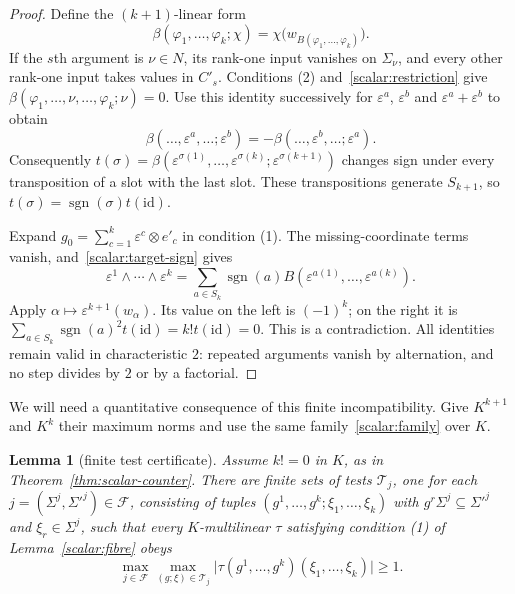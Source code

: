 \documentclass[11pt]{amsart}
\newtheorem{lemma}[theorem]{Lemma}
\theoremstyle{definition}
\theoremstyle{remark}
\numberwithin{equation}{section}
\newcommand{\sgn}{\operatorname{sgn}}
\newcommand{\id}{\mathrm{id}}
\newcommand{\abs}[1]{\lvert #1\rvert}
\begin{document}
\begin{proof}
Define the $(k+1)$\nobreakdash-linear form
\[
 \beta(\varphi_1,\dots,\varphi_k;\chi)
   =\chi\bigl(w_{B(\varphi_1,\dots,\varphi_k)}\bigr).
\]
If the $s$th argument is $\nu\in N$, its rank-one input vanishes on $\Sigma_\nu$, and every other
rank-one input takes values in $C'_s$. Conditions (2) and~\eqref{scalar:restriction} give
$\beta(\varphi_1,\dots,\nu,\dots,\varphi_k;\nu)=0$. Use this identity successively for
$\varepsilon^a$, $\varepsilon^b$ and $\varepsilon^a+\varepsilon^b$ to obtain
\[
 \beta(\dots,\varepsilon^a,\dots;\varepsilon^b)
 =-\beta(\dots,\varepsilon^b,\dots;\varepsilon^a).
\]
Consequently
$t(\sigma)=\beta(\varepsilon^{\sigma(1)},\dots,\varepsilon^{\sigma(k)};
\varepsilon^{\sigma(k+1)})$ changes sign under every transposition of a slot with the last slot.
These transpositions generate $S_{k+1}$, so $t(\sigma)=\sgn(\sigma)t(\id)$.

Expand $g_0=\sum_{c=1}^k\varepsilon^c\otimes e'_c$ in condition (1). The missing-coordinate terms vanish,
and~\eqref{scalar:target-sign} gives
\[
 \varepsilon^1\wedge\cdots\wedge\varepsilon^k
 =\sum_{a\in S_k}\sgn(a)B(\varepsilon^{a(1)},\dots,\varepsilon^{a(k)}).
\]
Apply $\alpha\mapsto\varepsilon^{k+1}(w_\alpha)$. Its value on the left is $(-1)^k$; on the right it is
$\sum_{a\in S_k}\sgn(a)^2t(\id)=k!t(\id)=0$. This is a contradiction. All identities remain valid in
characteristic $2$: repeated arguments vanish by alternation, and no step divides by $2$ or by a factorial.
\end{proof}

We will need a quantitative consequence of this finite incompatibility. Give $K^{k+1}$ and $K^k$ their
maximum norms and use the same family~\eqref{scalar:family} over $K$.

\begin{lemma}[finite test certificate]\label{scalar:certificate}
Assume $k!=0$ in $K$, as in Theorem~\ref{thm:scalar-counter}. There are finite sets of tests $\mathcal T_j$, one for each $j=(\Sigma^j,\Sigma'^j)\in\mathcal F$, consisting of
tuples $(g^1,\dots,g^k;\xi_1,\dots,\xi_k)$ with $g^r\Sigma^j\subseteq\Sigma'^j$ and $\xi_r\in\Sigma^j$,
such that every $K$\nobreakdash-multilinear $\tau$ satisfying condition (1) of Lemma~\ref{scalar:fibre} obeys
\begin{equation}\label{scalar:threshold}
 \max_{j\in\mathcal F}\max_{(g;\xi)\in\mathcal T_j}
 \abs{\tau(g^1,\dots,g^k)(\xi_1,\dots,\xi_k)}\ge1.
\end{equation}
\end{lemma}
\end{document}
